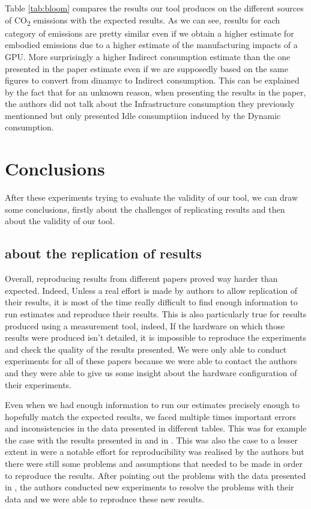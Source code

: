 \documentclass[11pt]{article}
\begin{document}
Table \ref{tab:bloom} compares  the results our tool produces on the
different sources of CO\textsubscript{2} emissions with the expected results.
As we can see, results for each category of emissions are pretty
similar even if we obtain a higher estimate for embodied emissions due
to a higher estimate of the manufacturing impacts of a GPU. More
surprisingly a higher Indirect consumption estimate than the one presented in
the paper estimate even if we are supposedly based on the same figures
to convert from dinamyc to Indirect consumption. This can be explained
by the fact that for an unknown reason, when presenting the results in
the paper, the authors did not talk about the Infrastructure consumption they
previously mentionned but only presented Idle consumptiion induced by
the Dynamic consumption.


\section{Conclusions}
\label{sec:org8ef1173}

After these experiments trying to evaluate the validity of our tool,
we can draw some conclusions, firstly about the challenges of
replicating results and then about the validity of our tool.

\subsection{about the replication of results}
\label{sec:orgc6667cc}

Overall, reproducing results from different papers proved way harder
than expected. Indeed, Unless a real effort is made by authors to allow replication of
their results, it is most of the time really difficult to find
enough information to run estimates and reproduce their
results.
This is also particularly true for results produced
using a measurement tool, indeed, If the hardware on which those
results were produced isn't detailed, it is impossible to
reproduce the experiments and check the quality of the results
presented. We were only able to conduct experiments for all of these
papers because we were able to contact the authors and they were
able to give us some insight about the hardware configuration of their experiments.

Even when we had enough information to run our estimates precisely
enough to hopefully match the expected results, we faced multiple
times important errors and inconsistencies in the data presented in
different tables. This was for example the case with the results
presented in \cite{Bannour2021evaluating} and in
\cite{Cattan2022benchmarking}. This was also the case to a lesser
extent in \cite{Jay2023experimental} were a notable effort for
reproducibility was realised by the authors but there were still
some problems and assumptions that needed to be made in order to
reproduce the results. 
After pointing out the problems with the data presented in
\cite{Cattan2022benchmarking}, the authors conducted new experiments
to resolve the problems with their data and we were able to reproduce
these new results.
\end{document}
